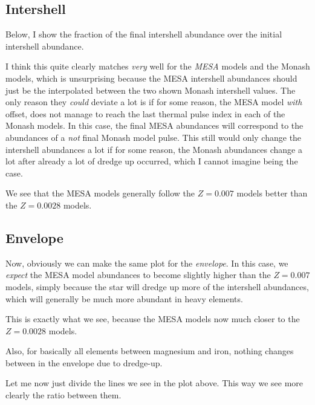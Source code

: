 \documentclass[a4paper,10pt]{article}
\begin{document}
\subsection{Intershell}
Below, I show the fraction of the final intershell abundance over the initial intershell abundance.

\begin{figure}[ht]
    \centering
\end{figure}

I think this quite clearly matches \emph{very} well for the \emph{MESA} models and the Monash models,
which is unsurprising because the MESA intershell abundances should just be the interpolated between
the two shown Monash intershell values. The only reason they \emph{could} deviate a lot is if for some
reason, the MESA model \emph{with} offset, does not manage to reach the last thermal pulse index in
each of the Monash models. In this case, the final MESA abundances will correspond to the abundances
of a \emph{not} final Monash model pulse. This still would only change the intershell abundances a lot
if for some reason, the Monash abundances change a lot after already a lot of dredge up occurred, which
I cannot imagine being the case.

We see that the MESA models generally follow the \(Z=0.007\) models better than the \(Z=0.0028\) models.

\subsection{Envelope}
Now, obviously we can make the same plot for the \emph{envelope}. In this case, we \emph{expect} the MESA
model abundances to become slightly higher than the \(Z=0.007\) models, simply because the star will dredge up more
of the intershell abundances, which will generally be much more abundant in heavy elements.

\begin{figure}[ht]
    \centering
\end{figure}

This is exactly what we see, because the MESA models now much closer to the \(Z=0.0028\) models.

Also, for basically all elements between magnesium and iron, nothing changes between in the 
envelope due to dredge-up.

Let me now just divide the lines we see in the plot above. This way we see more clearly the ratio between them.
\begin{figure}[ht]
    \centering
\end{figure}
\end{document}
